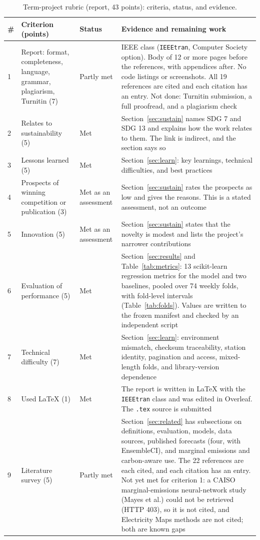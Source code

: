 \documentclass[10pt,journal,compsoc]{IEEEtran}
\begin{document}
\begin{table}[t]
\caption{Term-project rubric (report, 43 points): criteria, status, and evidence.}
\label{tab:termrubric}
\centering
\small
\begin{tabular}{@{}p{0.35cm}p{4.0cm}p{1.8cm}p{7.2cm}@{}}
\toprule
\# & Criterion (points) & Status & Evidence and remaining work \\
\midrule
1 & Report: format, completeness, language, grammar, plagiarism, Turnitin (7) & Partly met & IEEE class (\texttt{IEEEtran}, Computer Society option). Body of 12 or more pages before the references, with appendices after. No code listings or screenshots. All 19 references are cited and each citation has an entry. Not done: Turnitin submission, a full proofread, and a plagiarism check \\
2 & Relates to sustainability (5) & Met & Section~\ref{sec:sustain} names SDG 7 and SDG 13 and explains how the work relates to them. The link is indirect, and the section says so \\
3 & Lessons learned (5) & Met & Section~\ref{sec:learn}: key learnings, technical difficulties, and best practices \\
4 & Prospects of winning competition or publication (3) & Met as an assessment & Section~\ref{sec:sustain} rates the prospects as low and gives the reasons. This is a stated assessment, not an outcome \\
5 & Innovation (5) & Met as an assessment & Section~\ref{sec:sustain} states that the novelty is modest and lists the project's narrower contributions \\
6 & Evaluation of performance (5) & Met & Section~\ref{sec:results} and Table~\ref{tab:metrics}: 13 scikit-learn regression metrics for the model and two baselines, pooled over 74 weekly folds, with fold-level intervals (Table~\ref{tab:folds}). Values are written to the frozen manifest and checked by an independent script \\
7 & Technical difficulty (7) & Met & Section~\ref{sec:learn}: environment mismatch, checksum traceability, station identity, pagination and access, mixed-length folds, and library-version dependence \\
8 & Used LaTeX (1) & Met & The report is written in LaTeX with the \texttt{IEEEtran} class and was edited in Overleaf. The \texttt{.tex} source is submitted \\
9 & Literature survey (5) & Partly met & Section~\ref{sec:related} has subsections on definitions, evaluation, models, data sources, published forecasts (four, with EnsembleCI), and marginal emissions and carbon-aware use. The 22 references are each cited, and each citation has an entry. Not yet met for criterion 1: a CAISO marginal-emissions neural-network study (Mayes et al.) could not be retrieved (HTTP 403), so it is not cited, and Electricity Maps methods are not cited; both are known gaps\\
\bottomrule
\end{tabular}
\end{table}
\end{document}
